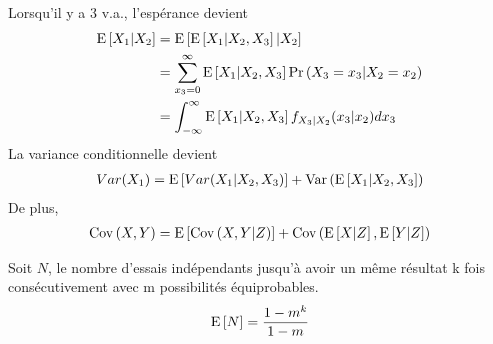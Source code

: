 \documentclass[10pt, french, landscape]{article}
\begin{document}
\begin{multicols*}{2}
Lorsqu'il y a 3 v.a., l'espérance devient
\begin{align*}
\mathrm{E} \left[ X_1 | X_2 \right]	& = \mathrm{E} \left[ \mathrm{E} \left[ X_1 | X_2, X_3 \right] | X_2 \right] \\
	& = \sum_{x_3 = 0}^{\infty} \mathrm{E} \left[ X_1 | X_2, X_3 \right] \Pr \left( X_3 = x_3 | X_2 = x_2 \right) \\
	& = \int_{-\infty}^{\infty} \mathrm{E} \left[ X_1 | X_2, X_3 \right] f_{X_3| X_2}(x_3 | x_2) dx_3
\end{align*}
La variance conditionnelle devient
\begin{align*}
Var(X_1) = \mathrm{E} \left[ Var(X_1 | X_2, X_3) \right]  + \mathrm{Var} \left( \mathrm{E} \left[ X_1 | X_2, X_3 \right] \right)
\end{align*}
De plus,
\begin{align*}
\mathrm{Cov} \left( X, Y \right) = \mathrm{E} \left[ \mathrm{Cov} \left( X, Y | Z \right) \right] + \mathrm{Cov} \left( \mathrm{E} \left[ X | Z \right], \mathrm{E} \left[ Y | Z \right] \right)
\end{align*}


Soit $N$, le nombre d'essais indépendants jusqu'à avoir un même résultat k fois consécutivement avec m possibilités équiprobables.
\begin{align*}
	\mathrm{E} \left[ N \right] &= \frac{1 - m^{k}}{1 - m} \\
\end{align*}

%


\end{multicols*}
\end{document}
